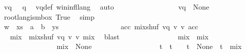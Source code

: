 \begin{isabellebody}
\ {\isachardoublequoteopen}vq\ {\isasymin}\ {\isasymL}\ q{\isachardoublequoteclose}\ \isamarkupfalse%
\ vq{\isacharunderscore}{\kern0pt}def\ w{\isacharunderscore}{\kern0pt}in{\isacharunderscore}{\kern0pt}infl{\isacharunderscore}{\kern0pt}lang\ \isamarkupfalse%
\ auto\isanewline
\ \ \ \ \ \ \ \ \ \ \ \ \ \ \isamarkupfalse%
\ \isamarkupfalse%
\ {\isachardoublequoteopen}vq\ {\isasymin}\ {\isasymT}\isactrlbsub None\isactrlesub {\isachardoublequoteclose}\ \isamarkupfalse%
\ root{\isacharunderscore}{\kern0pt}lang{\isacharunderscore}{\kern0pt}is{\isacharunderscore}{\kern0pt}mbox\ True\ \isamarkupfalse%
\ simp\ \isanewline
\ \ \ \ \ \ \ \ \ \ \ \ \ \ \ \ \ \ \isanewline
\ \ \ \ \ \ \ \ \ \ \ \ \ \ \isamarkupfalse%
\ {\isacharquery}{\kern0pt}w{\isacharprime}{\kern0pt}\ {\isacharequal}{\kern0pt}\ {\isachardoublequoteopen}xs\ {\isasymsqdot}\ a\ {\isacharhash}{\kern0pt}\ b\ {\isacharhash}{\kern0pt}\ ys{\isachardoublequoteclose}\isanewline
\ \ \ \ \ \ \ \ \ \ \ \ \ \ \isamarkupfalse%
\ {\isachardoublequoteopen}{\isasymexists}\ acc{\isachardot}{\kern0pt}\ mix{\isacharunderscore}{\kern0pt}shuf\ vq\ v\ v{\isacharprime}{\kern0pt}\ acc{\isachardoublequoteclose}\ \isamarkupfalse%
\isanewline
\ \ \ \ \ \ \ \ \ \ \ \ \ \ \isamarkupfalse%
\ \isamarkupfalse%
\ mix\ \ {\isachardoublequoteopen}mix{\isacharunderscore}{\kern0pt}shuf\ vq\ v\ v{\isacharprime}{\kern0pt}\ mix{\isachardoublequoteclose}\ \isamarkupfalse%
\ blast\isanewline
\ \ \ \ \ \ \ \ \ \ \ \ \ \ \isamarkupfalse%
\ {\isacharquery}{\kern0pt}mix\ {\isacharequal}{\kern0pt}\ {\isachardoublequoteopen}mix{\isachardoublequoteclose}\isanewline
\ \ \ \ \ \ \ \ \ \ \ \ \ \ \isamarkupfalse%
\ {\isachardoublequoteopen}{\isacharquery}{\kern0pt}mix\ {\isasymin}\ {\isasymT}\isactrlbsub None\isactrlesub {\isachardoublequoteclose}\ \isamarkupfalse%
\isanewline
\ \ \ \ \ \ \ \ \ \ \ \ \ \ \isamarkupfalse%
\ \isamarkupfalse%
\ t\ \ {\isachardoublequoteopen}t\ {\isasymin}\ {\isasymL}\isactrlsub {\isasymzero}\ {\isasymand}\ t\ {\isasymin}\ {\isasymT}\isactrlbsub None\isactrlesub {\isasymdownharpoonright}\isactrlsub {\isacharbang}{\kern0pt}\ {\isasymand}\ t\ {\isacharequal}{\kern0pt}\ {\isacharparenleft}{\kern0pt}{\isacharquery}{\kern0pt}mix{\isacharparenright}{\kern0pt}{\isasymdown}\isactrlsub {\isacharbang}{\kern0pt}{\isachardoublequoteclose}\ \isamarkupfalse%

\end{isabellebody}
